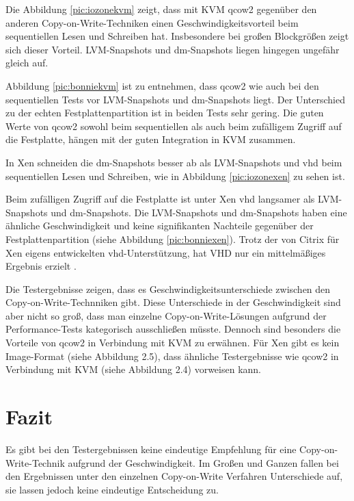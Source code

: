 Die Abbildung \ref{pic:iozonekvm} zeigt, dass mit KVM qcow2 gegenüber den anderen Copy-on-Write-Techniken einen Geschwindigkeitsvorteil beim sequentiellen Lesen und Schreiben hat. Insbesondere bei großen Blockgrößen zeigt sich dieser Vorteil. LVM-Snapshots und dm-Snapshots liegen hingegen ungefähr gleich auf.

Abbildung \ref{pic:bonniekvm} ist zu entnehmen, dass qcow2 wie auch bei den sequentiellen Tests vor LVM-Snapshots und dm-Snapshots liegt. Der Unterschied zu der echten Festplattenpartition ist in beiden Tests sehr gering. Die guten Werte von qcow2 sowohl beim sequentiellen als auch beim zufälligem Zugriff auf die Festplatte, hängen mit der guten Integration in KVM zusammen.

In Xen schneiden die dm-Snapshots besser ab als LVM-Snapshots und vhd beim sequentiellen Lesen und Schreiben, wie in Abbildung \ref{pic:iozonexen} zu sehen ist. 

Beim zufälligen Zugriff auf die Festplatte ist unter Xen vhd langsamer als LVM-Snapshots und dm-Snapshots. Die LVM-Snapshots und dm-Snapshots haben eine ähnliche Geschwindigkeit und keine signifikanten Nachteile gegenüber der Festplattenpartition (siehe Abbildung \ref{pic:bonniexen}). Trotz der von Citrix für Xen eigens entwickelten vhd-Unterstützung, hat VHD nur ein mittelmäßiges Ergebnis erzielt \cite{citrixvhd}. 

Die Testergebnisse zeigen, dass es Geschwindigkeitsunterschiede zwischen den Copy-on-Write-Technniken gibt. Diese Unterschiede in der Geschwindigkeit sind aber nicht so groß, dass man einzelne Copy-on-Write-Lösungen aufgrund der Performance-Tests kategorisch ausschließen müsste. Dennoch sind besonders die Vorteile von qcow2 in Verbindung mit KVM zu erwähnen. Für Xen gibt es kein Image-Format (siehe Abbildung 2.5), dass ähnliche Testergebnisse wie qcow2 in Verbindung mit KVM (siehe Abbildung 2.4) vorweisen kann. 

\section{Fazit}
Es gibt bei den Testergebnissen keine eindeutige Empfehlung für eine Copy-on-Write-Technik aufgrund der Geschwindigkeit. Im Großen und Ganzen fallen bei den Ergebnissen unter den einzelnen Copy-on-Write Verfahren Unterschiede auf, sie lassen jedoch keine eindeutige Entscheidung zu.

